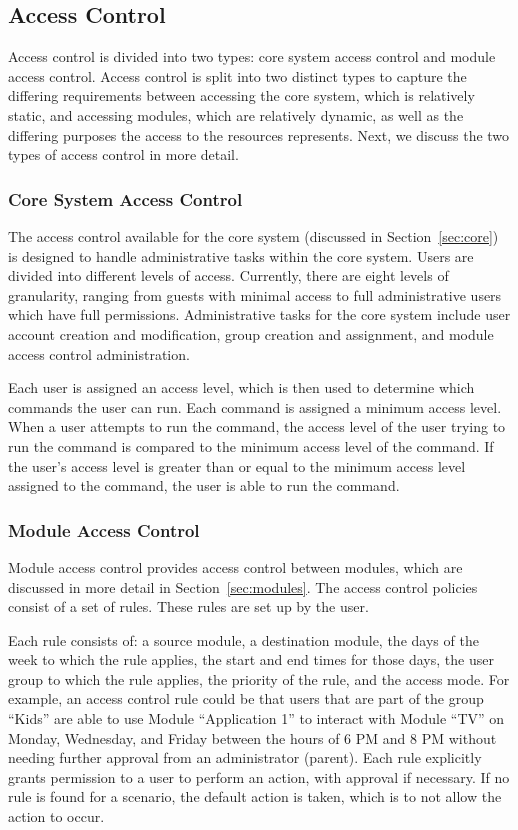 \subsection{Access Control}
\label{sec:access}
Access control is divided into two types: core system access control and module
access control. Access control is split into two distinct types to capture the
differing requirements between accessing the core system, which is relatively
static, and accessing modules, which are relatively dynamic, as well as the
differing purposes the access to the resources represents. Next, we discuss the
two types of access control in more detail.
\subsubsection{Core System Access Control}
\label{sec:core_access}
The access control available for the core system (discussed in
Section~\ref{sec:core}) is designed to handle administrative tasks within the
core system. Users are divided into different levels of access. Currently, there
are eight levels of granularity, ranging from guests with minimal access to
full administrative users which have full permissions. Administrative tasks for
the core system include user account creation and modification, group creation
and assignment, and module access control administration.

Each user is assigned an access level, which is then used to determine which
commands the user can run. Each command is assigned a minimum access level.
When a user attempts to run the command, the access level of the user trying to
run the command is compared to the minimum access level of the command. If the
user's access level is greater than or equal to the minimum access level
assigned to the command, the user is able to run the command.
\subsubsection{Module Access Control}
Module access control provides access control between modules, which are
discussed in more detail in Section~\ref{sec:modules}. The access control
policies consist of a set of rules. These rules are set up by the user.

Each rule consists of: a source module, a destination module, the days of the
week to which the rule applies, the start and end times for those days, the user
group to which the rule applies, the priority of the rule, and the access mode.
For example, an access control rule could be that users that are part of the
group ``Kids'' are able to use Module ``Application 1'' to interact with Module
``TV'' on Monday, Wednesday, and Friday between the hours of 6 PM and 8 PM
without needing further approval from an administrator (parent). Each rule
explicitly grants permission to a user to perform an action, with approval if
necessary. If no rule is found for a scenario, the default action is taken,
which is to not allow the action to occur.

